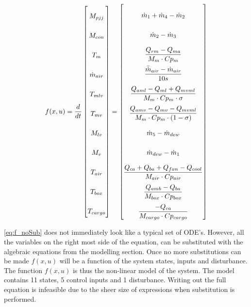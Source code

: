 \begin{equation} \label{eq:f_noSub} \renewcommand{\arraystretch}{2.4}
	f(x,u) =  \dfrac{d}{dt} \begin{bmatrix}
		M_{pjj}			\\				%
		M_{con} 		\\				%
		T_m 			\\				%
		\dot{m}_{air}	\\				%
		T_{mlv}			\\				%
		T_{mv}			\\				%
		M_{lv}			\\				%
		M_v				\\				%
		T_{air}			\\				%
		T_{box}			\\				%
		T_{cargo}		\\				%

	\end{bmatrix}
	=
	\begin{bmatrix}
		\dot{m}_1 + \dot{m}_4 - \dot{m}_2 \\										%
		\dot{m}_{2} - \dot{m}_{3}	\\												%
		\dfrac{Q_{rm} - Q_{ma}}{M_m \cdot Cp_m} \\									%
		\dfrac{\bar{\dot{m}}_{air}  - \dot{m}_{air}} {10s}		\\					%
		\dfrac{Q_{aml}-Q_{ml} + Q_{mvml}}{M_m \cdot Cp_m \cdot \sigma}        \\	%
		\dfrac{Q_{amv} - Q_{mv} - Q_{mvml}}{M_m \cdot Cp_m \cdot (1- \sigma)}	\\	%
		\dot{m}_{5} - \dot{m}_{dew}		\\											%
		\dot{m}_{dew} - \dot{m}_{1}	\\												%
		\dfrac{Q_{ca} + Q_{ba} + Q_{fan} -Q_{cool}}{M_{air} \cdot Cp_{air}} \\		%
		\dfrac{Q_{amb} - Q_{ba}}{M_{box} \cdot Cp_{box}} \\							%
		\dfrac{-Q_{ca}}{M_{cargo} \cdot Cp_{cargo}}									%
	\end{bmatrix}
\end{equation}

\cref{eq:f_noSub} does not immediately look like a typical set of ODE's. However, all the variables on the right most side of the equation, can be substituted with the algebraic equations from the modelling section. Once no more substitutions can be made $f(x,u)$ will be a function of the system states, inputs and disturbance. The function $f(x,u)$ is thus the non-linear model of the system. The model contains 11 states, 5 control inputs and 1 disturbance. Writing out the full equation is infeasible due to the sheer size of expressions when substitution is performed.


